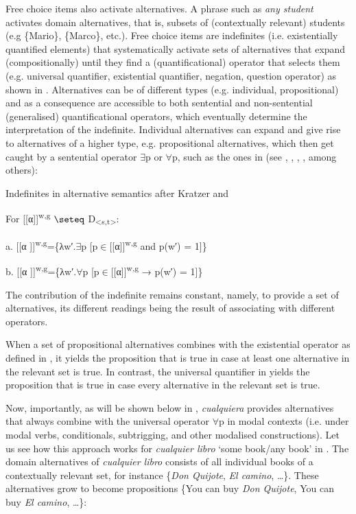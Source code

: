   Free choice items also activate alternatives. A phrase such as \textit{any student} activates domain alternatives, that is, subsets of (contextually relevant) students (e.g \{Mario\}, \{Marco\}, etc.). Free choice items are indefinites (i.e. existentially quantified elements) that systematically activate sets of alternatives that expand (compositionally) until they find a (quantificational) operator that selects them (e.g. universal quantifier, existential quantifier, negation, question operator) as shown in . Alternatives can be of different types (e.g. individual, propositional) and as a consequence are accessible to both sentential and non-sentential (generalised) quantificational operators, which eventually determine the interpretation of the indefinite. Individual alternatives can expand and give rise to alternatives of a higher type, e.g. propositional alternatives, which then get caught by a sentential operator ${\exists}$p or ${\forall}$p, such as the ones in  (see \citealt{KratzerShimoyama2002}, \citealt{Chierchia2006}, \citealt{Aloni2007}, \citealt{Alonso-OvalleMenéndez-Benito2011}, among others):

\label{bkm:Ref533761448}  Indefinites in alternative semantics after Kratzer and \citet[8]{Shimoyama2002}

  For [[α]]\textsuperscript{w,g} ${\seteq}$ D\textsubscript{<s,t>}:

  a.  [[α ]]\textsuperscript{w,g}=\{λw′.${\exists}$p [p${\in}$[[α]]\textsuperscript{w,g} and p(w′) = 1]\}

  b.  [[α ]]\textsuperscript{w,g}=\{λw′.${\forall}$p [p${\in}$[[α]]\textsuperscript{w,g} → p(w′) = 1]\}

The contribution of the indefinite remains constant, namely, to provide a set of alternatives, its different readings being the result of associating with different operators.

  When a set of propositional alternatives combines with the existential operator as defined in , it yields the proposition that is true in case at least one alternative in the relevant set is true. In contrast, the universal quantifier in  yields the proposition that is true in case every alternative in the relevant set is true. 

  Now, importantly, as will be shown below in , \textit{cualquiera} provides alternatives that always combine with the universal operator ${\forall}$p in modal contexts (i.e. under modal verbs, conditionals, subtrigging, and other modalised constructions). Let us see how this approach works for \textit{cualquier libro} ‘some book/any book’ in . The domain alternatives of \textit{cualquier libro} consists of all individual books of a contextually relevant set, for instance \{\textit{Don Quijote}, \textit{El camino}, …\}. These alternatives grow to become propositions \{You can buy \textit{Don Quijote}, You can buy \textit{El camino}, …\}:

